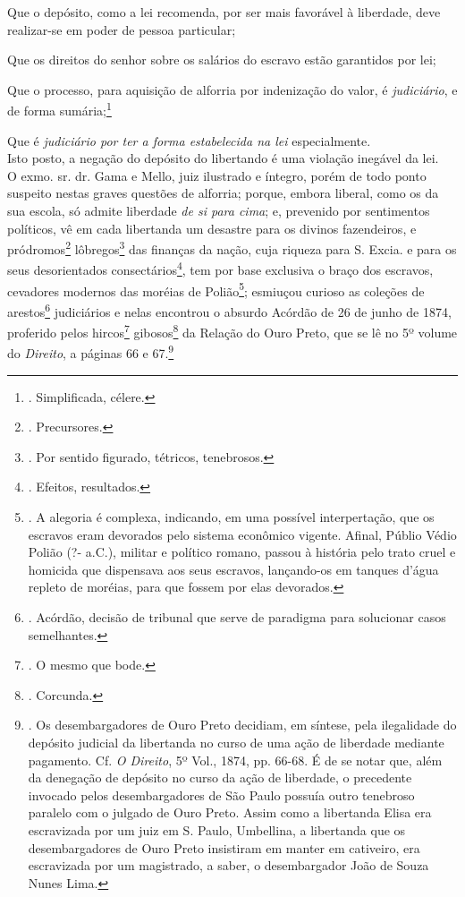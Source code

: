 Que o depósito, como a lei recomenda, por ser mais favorável à
liberdade, deve realizar-se em poder de pessoa particular;

Que os direitos do senhor sobre os salários do escravo estão garantidos
por lei;

Que o processo, para aquisição de alforria por indenização do valor, é
\emph{judiciário}, e de forma sumária;\footnote{. Simplificada, célere.}

Que é \emph{judiciário por ter a forma estabelecida na lei}
especialmente.\\
Isto posto, a negação do depósito do libertando é uma violação inegável
da lei.\\
O exmo. sr. dr. Gama e Mello, juiz ilustrado e íntegro, porém de todo
ponto suspeito nestas graves questões de alforria; porque, embora
liberal, como os da sua escola, só admite liberdade \emph{de si para
cima}; e, prevenido por sentimentos políticos, vê em cada libertanda um
desastre para os divinos fazendeiros, e pródromos\footnote{.
  Precursores.} lôbregos\footnote{. Por sentido figurado, tétricos,
  tenebrosos.} das finanças da nação, cuja riqueza para S. Excia. e para
os seus desorientados consectários\footnote{. Efeitos, resultados.}, tem
por base exclusiva o braço dos escravos, cevadores modernos das moréias
de Polião\footnote{. A alegoria é complexa, indicando, em uma possível
  interpertação, que os escravos eram devorados pelo sistema econômico
  vigente. Afinal, Públio Védio Polião (?- a.C.), militar e político
  romano, passou à história pelo trato cruel e homicida que dispensava
  aos seus escravos, lançando-os em tanques d'água repleto de moréias,
  para que fossem por elas devorados.}; esmiuçou curioso as coleções de
arestos\footnote{. Acórdão, decisão de tribunal que serve de paradigma
  para solucionar casos semelhantes.} judiciários e nelas encontrou o
absurdo Acórdão de 26 de junho de 1874, proferido pelos hircos\footnote{.
  O mesmo que bode.} gibosos\footnote{. Corcunda.} da Relação do Ouro
Preto, que se lê no 5º volume do \emph{Direito}, a páginas 66 e
67.\footnote{. Os desembargadores de Ouro Preto decidiam, em síntese,
  pela ilegalidade do depósito judicial da libertanda no curso de uma
  ação de liberdade mediante pagamento. Cf. \emph{O Direito}, 5º Vol.,
  1874, pp. 66-68. É de se notar que, além da denegação de depósito no
  curso da ação de liberdade, o precedente invocado pelos
  desembargadores de São Paulo possuía outro tenebroso paralelo com o
  julgado de Ouro Preto. Assim como a libertanda Elisa era escravizada
  por um juiz em S. Paulo, Umbellina, a libertanda que os
  desembargadores de Ouro Preto insistiram em manter em cativeiro, era
  escravizada por um magistrado, a saber, o desembargador João de Souza
  Nunes Lima.}

